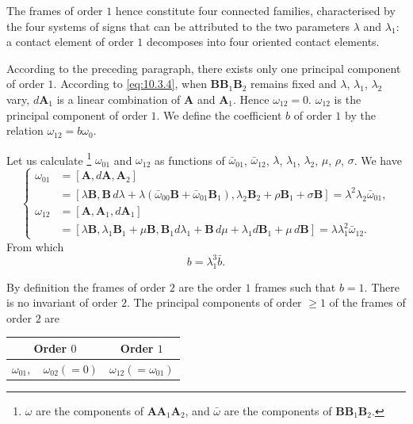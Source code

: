 \documentclass[leqno,11pt]{book}
\numberwithin{equation}{chapter}
\theoremstyle{shape1}
\theoremstyle{shapesmall}
\begin{document}
The frames of order $1$ hence constitute four connected families, characterised by the four systems of signs that can be attributed to the two parameters $\lambda$ and $\lambda_{1}$: a contact element of order $1$ decomposes into four oriented contact elements.

According to the preceding paragraph, there exists only one principal component of order $1$. According to \eqref{eq:10.3.4}, when $\mathbf{BB}_{1}\mathbf{B}_{2}$ remains fixed and $\lambda$, $\lambda_{1}$, $\lambda_{2}$ vary, $d\mathbf{A}_{1}$ is a linear combination of $\mathbf{A}$ and $\mathbf{A}_{1}$. Hence $\omega_{12}=0$. $\omega_{12}$ is the principal component of order $1$. We define the coefficient $b$ of order $1$ by the relation $\omega_{12}=b\omega_{0}$.

Let us calculate \footnote{$\omega$ are the components of $\mathbf{AA}_{1}\mathbf{A}_{2}$, and $\bar\omega$ are the components of $\mathbf{BB}_{1}\mathbf{B}_{2}$.} $\omega_{01}$ and $\omega_{12}$ as functions of $\bar\omega_{01}$, $\bar\omega_{12}$, $\lambda$, $\lambda_{1}$, $\lambda_{2}$, $\mu$, $\rho$, $\sigma$. We have
\begin{equation}
  \label{eq:10.3.5}
  \left\{
    \begin{aligned}      
      \omega_{01}&=[\mathbf{A},d\mathbf{A},\mathbf{A}_{2}]\\
      &=[\lambda\mathbf{B},\mathbf{B}\,d\lambda+\lambda(\bar\omega_{00}\mathbf{B}+\bar\omega_{01}\mathbf{B}_{1}),\lambda_{2}\mathbf{B}_{2}+\rho\mathbf{B}_{1}+\sigma\mathbf{B}]=\lambda^{2}\lambda_{2}\bar\omega_{01},\\
      \omega_{12}&=[\mathbf{A},\mathbf{A}_{1},d\mathbf{A}_{1}]\\
      &=[\lambda\mathbf{B},\lambda_{1}\mathbf{B}_{1}+\mu\mathbf{B},\mathbf{B}_{1}d\lambda_{1}+\mathbf{B}\,d\mu+\lambda_{1}d\mathbf{B}_{1}+\mu\,d\mathbf{B}]=\lambda\lambda^{2}_{1}\bar\omega_{12}.
    \end{aligned}
  \right.
\end{equation}
From which
\begin{equation}
  \label{eq:10.3.6}
  b=\lambda^{3}_{1}\bar b.
\end{equation}

By definition the frames of order $2$ are the order $1$ frames such that $b=1$. There is no invariant of order $2$. The principal components of order $\ge 1$ of the frames of order $2$ are
\begin{center}  
  \begin{tabular}{|c|c|}
    \hline
    Order $0$&Order $1$\\
    \hline
    $\omega_{01},\quad\omega_{02}(=0)$&$\omega_{12}(=\omega_{01})$\\
    \hline
  \end{tabular}
\end{center}
\end{document}
